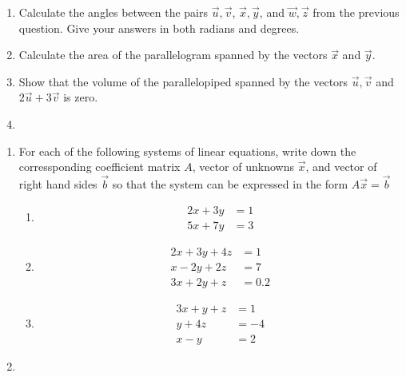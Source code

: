 \documentclass[12pt,a4paper]{article}
\begin{document}
\begin{enumerate}
	\item
	Calculate the angles between the pairs $\vec{u},\vec{v}$, $\vec{x},\vec{y}$, and $\vec{w},\vec{z}$ from the previous question. Give your answers in both radians and degrees.
	
	\item
	Calculate the area of the parallelogram spanned by the vectors $\vec{x}$ and $\vec{y}$.
	\item
	Show that the volume of the parallelopiped spanned by the vectors $\vec{u},\vec{v}$ and $2\vec{u}+3\vec{v}$ is zero.
	
	\item
	
\end{enumerate}

\begin{enumerate}
	\item
	For each of the following systems of linear equations, write down the corressponding coefficient matrix $A$, vector of unknowns $\vec{x}$, and vector of right hand sides $\vec{b}$ so that the system can be expressed in the form $A\vec{x}=\vec{b}$
	\begin{multicols}{3}
		\begin{enumerate}
			\item
			\begin{align*}
			2x+3y&=1\\
			5x+7y&=3
			\end{align*}
			\item\begin{align*}
			2x+3y+4z&=1\\
			x-2y+2z&=7\\
			3x+2y+z&=0.2
			\end{align*}
			\item
			\begin{align*}
			3x+y+z&=1\\
			y+4z&=-4\\
			x-y&=2
			\end{align*}
		\end{enumerate}
	\end{multicols}
	\item
\end{enumerate}
\end{document}
